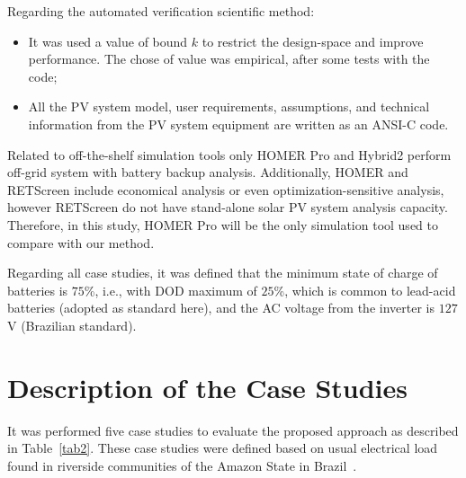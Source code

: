 Regarding the automated verification scientific method:

\begin{itemize}
\item It was used a value of bound $k$ to restrict the design-space and improve performance. The chose of value was empirical, after some tests with the code;
\item All the PV system model, user requirements, assumptions, and technical information from the PV system equipment are written as an ANSI-C code.
\end{itemize}

Related to off-the-shelf simulation tools only HOMER Pro and Hybrid2 perform off-grid system with battery backup analysis. Additionally, HOMER and RETScreen include economical analysis or even optimization-sensitive analysis, however RETScreen do not have stand-alone solar PV system analysis capacity. Therefore, in this study, HOMER Pro will be the only simulation tool used to compare with our method.  

Regarding all case studies, it was defined that the minimum state of charge of batteries is $75$\%, i.e., with DOD maximum of $25$\%, which is common to lead-acid batteries (adopted as standard here), and the AC voltage from the inverter is $127$ V (Brazilian standard).


\section{Description of the Case Studies}

It was performed five case studies to evaluate the proposed approach as described in Table~\ref{tab2}. %
These case studies were defined based on usual electrical load found in riverside communities of the Amazon State in Brazil~\cite{abs-1811-09438, Agrener2013}.


